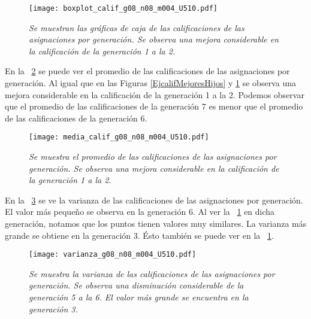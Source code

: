 \begin{figure}[h]
\centering
\texttt{[image: boxplot\_calif\_g08\_n08\_m004\_U510.pdf]} %
\caption[\textit{Gráficas de caja de calificaciones de asignaciones por generación}]{\textit{Se muestran las gráficas de caja de las calificaciones de las asignaciones por generación. Se observa una mejora considerable en la calificación de la generación 1 a la 2.}}\label{boxplot_calif_x_generacion}
\end{figure}

En la \figurename{~\ref{media_calif_x_generacion}} se puede ver el promedio de las calificaciones de las asignaciones por generación. Al igual que en las Figuras \ref{EjcalifMejoresHijos} y \ref{boxplot_calif_x_generacion} se observa una mejora considerable en la calificación de la generación 1 a la 2. Podemos observar que el promedio de las calificaciones de la generación 7 es menor que el promedio de las calificaciones de la generación 6.


\begin{figure}[H]
\centering
\texttt{[image: media\_calif\_g08\_n08\_m004\_U510.pdf]} %
\caption[\textit{Media de calificaciones de asignaciones por generación}]{\textit{Se muestra el promedio de las calificaciones de las asignaciones por generación. Se observa una mejora considerable en la calificación de la generación 1 a la 2.}}\label{media_calif_x_generacion}
\end{figure}

En la \figurename{~\ref{var_calif_x_generacion}} se ve la varianza de las calificaciones de las asignaciones por generación. El valor más pequeño se observa en la generación 6. Al ver la \figurename{~\ref{boxplot_calif_x_generacion}} en dicha generación, notamos que los puntos tienen valores muy similares. La varianza más grande se obtiene en la generación 3. Ésto también se puede ver en la \figurename{~\ref{boxplot_calif_x_generacion}}.


\begin{figure}[H]
\centering
\texttt{[image: varianza\_g08\_n08\_m004\_U510.pdf]} %
\caption[\textit{Varianza de calificaciones de asignaciones por generación}]{\textit{Se muestra la varianza de las calificaciones de las asignaciones por generación. Se observa una disminución considerable de la generación 5 a la 6. El valor más grande se encuentra en la generación 3.}}\label{var_calif_x_generacion}
\end{figure}

